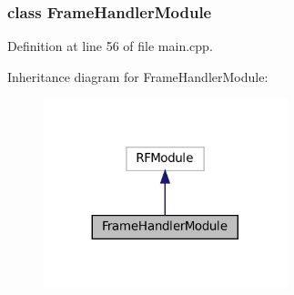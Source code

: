 \subsubsection{class Frame\+Handler\+Module}


Definition at line 56 of file main.\+cpp.



Inheritance diagram for Frame\+Handler\+Module\+:
\nopagebreak
\begin{figure}[H]
\begin{center}
\leavevmode
\includegraphics[width=200pt]{classFrameHandlerModule__inherit__graph}
\end{center}
\end{figure}
